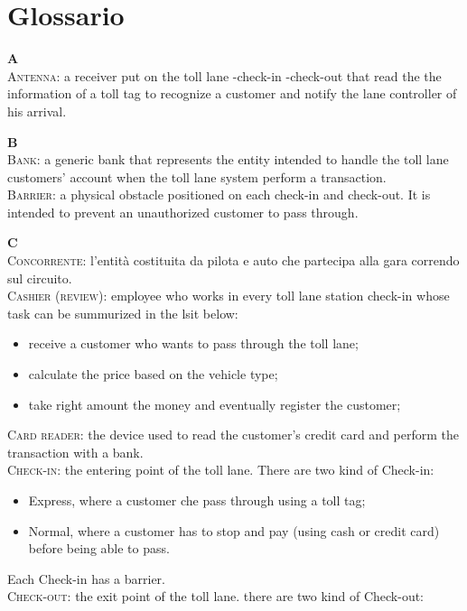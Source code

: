 \section{Glossario}
\begin{list}{}
\item \textbf{A}\\
\textsc{Antenna}: a receiver put on the toll lane -check-in -check-out that read the the information of a toll tag to recognize a customer and notify the lane controller of his arrival.\\
\item \textbf{B}\\
\textsc{Bank}: a generic bank that represents the entity intended to handle the toll lane customers' account when the toll lane system perform a transaction.\\
\textsc{Barrier}: a physical obstacle positioned on each check-in and check-out. It is intended to prevent an unauthorized customer to pass through.\\
\item \textbf{C}\\
\textsc{Concorrente}: l'entità costituita da pilota e auto che partecipa alla gara correndo sul circuito.\\
\textsc{Cashier (review)}: employee who works in every toll lane station check-in whose task can be summurized in the lsit below:
\begin{itemize}
	\item receive a customer who wants to pass through the toll lane;
	\item calculate the price based on the vehicle type;
	\item take right amount the money and eventually register the customer;
\end{itemize}
\textsc{Card reader}: the device used to read the customer's credit card and perform the transaction with a bank.\\
\textsc{Check-in}: the entering point of the toll lane. There are two kind of Check-in:
\begin{itemize}
\item Express, where a customer che pass through using a toll tag;
\item Normal, where a customer has to stop and pay (using cash or credit card) before being able to pass.
\end{itemize}
Each Check-in has a barrier.\\
\textsc{Check-out}: the exit point of the toll lane. there are two kind of Check-out:

\end{list}

